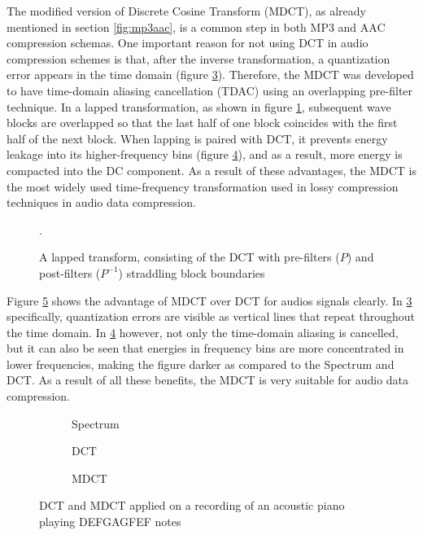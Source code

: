 The modified version of Discrete Cosine Transform (MDCT), as already mentioned in section \ref{fig:mp3aac}, is a common step in both MP3 and AAC compression schemas. One important reason for not using DCT in audio compression schemes is that, after the inverse transformation, a quantization error appears in the time domain (figure \ref{fig:piano-dct}). Therefore, the MDCT was developed to have time-domain aliasing cancellation (TDAC) using an overlapping pre-filter technique\cite{Princen1986TDAC}. In a lapped transformation, as shown in figure \ref{fig:lapped-dct}, subsequent wave blocks are overlapped so that the last half of one block coincides with the first half of the next block. When lapping is paired with DCT, it prevents energy leakage into its higher-frequency bins (figure \ref{fig:piano-mdct}), and as a result, more energy is compacted into the DC component. As a result of these advantages, the MDCT is the most widely used time-frequency transformation used in lossy compression techniques in audio data compression.

\begin{figure}[ht]
  
  \caption{A lapped transform, consisting of the DCT with pre-filters ($P$) and post-filters ($P^{-1}$) straddling block boundaries\cite{christopher_montgomery_next_2013}}.
  \label{fig:lapped-dct}
\end{figure}

Figure \ref{fig:piano-dct-mdct} shows the advantage of MDCT over DCT for audios signals clearly. In \ref{fig:piano-dct} specifically, quantization errors are visible as vertical lines that repeat throughout the time domain. In \ref{fig:piano-mdct} however, not only the time-domain aliasing is cancelled, but it can also be seen that energies in frequency bins are more concentrated in lower frequencies, making the figure darker as compared to the Spectrum and DCT. As a result of all these benefits, the MDCT is very suitable for audio data compression.

\begin{figure}[ht]
\centering
\begin{subfigure}{0.32\textwidth}
    
    \caption{Spectrum}
    \label{fig:piano-full-spec}
\end{subfigure}
\hfill
\begin{subfigure}{0.32\textwidth}
    
    \caption{DCT}
    \label{fig:piano-dct}
\end{subfigure}
\hfill
\begin{subfigure}{0.32\textwidth}
    
    \caption{MDCT}
    \label{fig:piano-mdct}
\end{subfigure}
\caption{DCT and MDCT applied on a recording of an acoustic piano playing DEFGAGFEF notes}
\label{fig:piano-dct-mdct}
\end{figure}

